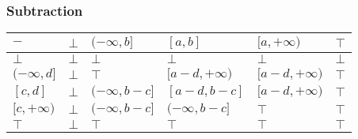 \documentclass[aspectratio=169]{beamer}
\begin{document}
    
        \begin{frame}
            \frametitle{Subtraction}
        \begin{table}[]
            \begin{tabular}{|l|l|l|l|l|l|}
            \hline
            $-$            & $\bot$ & $(-\infty, b]$     & $[a, b]$           & $[a, +\infty)$     & $\top$ \\ \hline
            $\bot$         & $\bot$ & $\bot$             & $\bot$             & $\bot$             & $\bot$ \\ \hline
            $(-\infty, d]$ & $\bot$ & $\top$             & $[a - d, +\infty)$ & $[a - d, +\infty)$ & $\top$ \\ \hline
            $[c, d]$       & $\bot$ & $(-\infty, b - c]$ & $[a - d, b - c]$   & $[a - d, +\infty)$ & $\top$ \\ \hline
            $[c, +\infty)$ & $\bot$ & $(-\infty, b - c]$ & $(-\infty, b - c]$ & $\top$             & $\top$ \\ \hline
            $\top$         & $\bot$ & $\top$             & $\top$             & $\top$             & $\top$ \\ \hline
            \end{tabular}
            \end{table}
        \end{frame}
    
    
    
\end{document}
